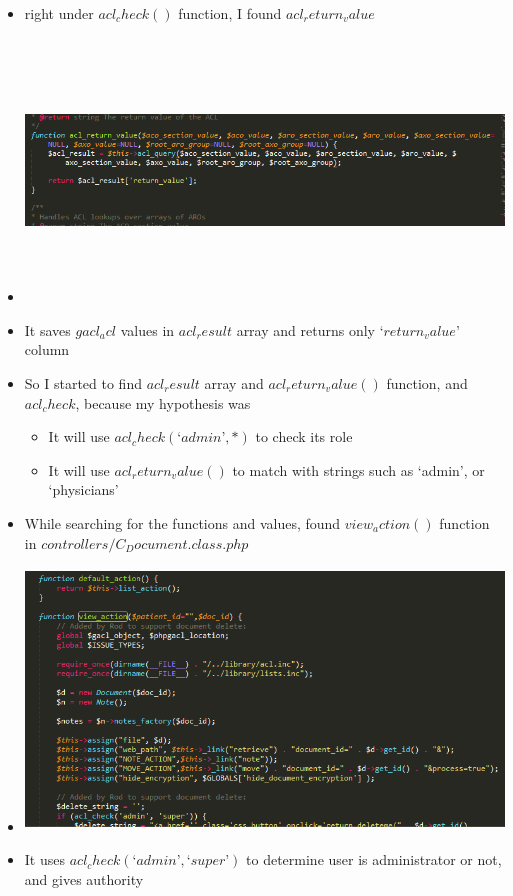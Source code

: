 \documentclass[paper=a4, fontsize=11pt]{scrartcl} %
\numberwithin{equation}{section} %
\numberwithin{figure}{section} %
\numberwithin{table}{section} %
\begin{document}
\begin{itemize}
		\item right under $acl_check()$ function, I found $acl_return_value$
		\item
		 \includegraphics[width = 20cm, height=7cm]{pictures/aclrvdf.png}
		\item It saves $gacl_acl$ values in $acl_result$ array and returns only $ ‘return_value’$ column
		\item So I started to find $acl_result$ array and $acl_return_value()$ function, and $acl_check$, because my hypothesis was
			\begin{itemize}
				\item It will use $acl_check(‘admin’, *)$ to check its role
				\item It will use $acl_return_value()$ to match with strings such as ‘admin’, or ‘physicians’
			\end{itemize}
		\item While searching for the functions and values, found $view_action()$ function in $controllers/C_Document.class.php$
		\item
		 \includegraphics[width = 20cm, height=7cm]{pictures/2ndaclcheck.png}
		\item It uses $acl_check(‘admin’, ‘super’)$ to determine user is administrator or not, and gives authority

\end{itemize}
\end{document}
